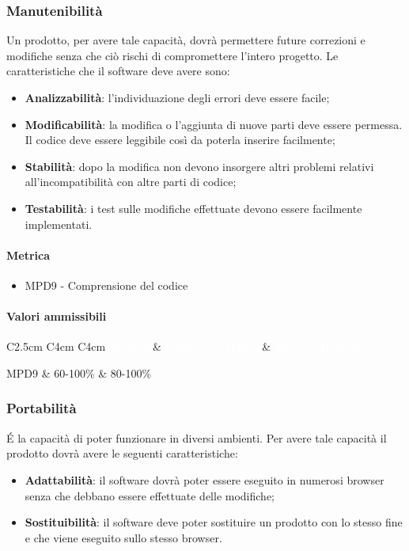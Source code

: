 \subsubsection{Manutenibilità}
Un prodotto, per avere tale capacità, dovrà permettere future correzioni e modifiche senza che ciò rischi di compromettere l'intero progetto. Le caratteristiche che il software deve avere sono:
\begin{itemize}
\item \textbf{Analizzabilità}: l'individuazione degli errori deve essere facile;
\item \textbf{Modificabilità}: la modifica o l'aggiunta di nuove parti deve essere permessa. Il codice deve essere leggibile così da poterla inserire facilmente;
\item \textbf{Stabilità}: dopo la modifica non devono insorgere altri problemi relativi all'incompatibilità con altre parti di codice;
\item \textbf{Testabilità}: i test sulle modifiche effettuate devono essere facilmente implementati.
\end{itemize}
\paragraph{Metrica}
\begin{itemize}
\item MPD9 - Comprensione del codice
\end{itemize}
\paragraph{Valori ammissibili}
\renewcommand{\arraystretch}{1.5}
\begin{longtable}{C{2.5cm} C{4cm} C{4cm}}
\textcolor{white}{\textbf{Metrica}}&
\textcolor{white}{\textbf{Valori accettabile}}&
\textcolor{white}{\textbf{Valore ottimale}}\\	
\endhead
\endfoot
{}\caption{Metrica di qualità del prodotto riguardo la manutenibilità}
\endlastfoot
		MPD9 &  
		60-100\% &
		80-100\% \\
\end{longtable}
\subsubsection{Portabilità}
\'E la capacità di poter funzionare in diversi ambienti. Per avere tale capacità il prodotto dovrà avere le seguenti caratteristiche:
\begin{itemize}
\item \textbf{Adattabilità}: il software dovrà poter essere eseguito in numerosi browser senza che debbano essere effettuate delle modifiche;
\item \textbf{Sostituibilità}: il software deve poter sostituire un prodotto con lo stesso fine e che viene eseguito sullo stesso browser. 
\end{itemize}
